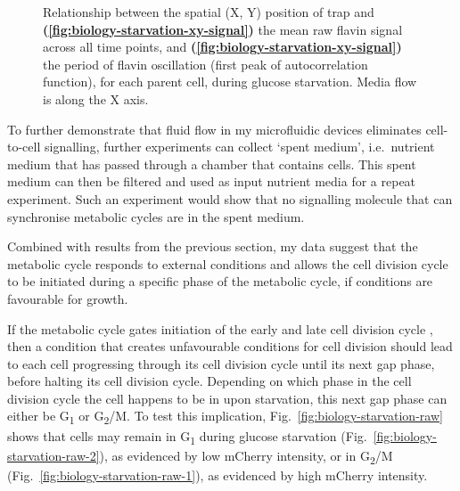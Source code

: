\begin{figure}[ht!]
  \caption[
    Relationship between the spatial position of trap and the mean raw flavin signal across all time points, and the period of flavin oscillation, for each parent cell, during glucose starvation.
  ]{
    Relationship between the spatial (X, Y) position of trap and
    \textbf{(\ref{fig:biology-starvation-xy-signal})} the mean raw flavin signal across all time points, and
    \textbf{(\ref{fig:biology-starvation-xy-signal})} the period of flavin oscillation (first peak of autocorrelation function), for each parent cell, during glucose starvation.
    Media flow is along the X axis.
  }
  \label{fig:biology-starvation-xy}
\end{figure}

To further demonstrate that fluid flow in my microfluidic devices eliminates cell-to-cell signalling, further experiments can collect `spent medium', i.e.\ nutrient medium that has passed through a chamber that contains cells.
This spent medium can then be filtered and used as input nutrient media for a repeat experiment.
Such an experiment would show that no signalling molecule that can synchronise metabolic cycles are in the spent medium.

Combined with results from the previous section, my data suggest that the metabolic cycle responds to external conditions and allows the cell division cycle to be initiated during a specific phase of the metabolic cycle, if conditions are favourable for growth.

If the metabolic cycle gates initiation of the early and late cell division cycle \parencite{ozsezenInferenceHighLevelInteraction2019}, then a condition that creates unfavourable conditions for cell division should lead to each cell progressing through its cell division cycle until its next gap phase, before halting its cell division cycle.
Depending on which phase in the cell division cycle the cell happens to be in upon starvation, this next gap phase can either be G\textsubscript{1} or G\textsubscript{2}/M.
To test this implication, Fig.\ \ref{fig:biology-starvation-raw} shows that cells may remain in G\textsubscript{1} during glucose starvation (Fig.\ \ref{fig:biology-starvation-raw-2}), as evidenced by low mCherry intensity, or in G\textsubscript{2}/M (Fig.\ \ref{fig:biology-starvation-raw-1}), as evidenced by high mCherry intensity.

